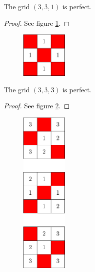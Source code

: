 \begin{con}
\label{con:3x3x1}
The grid $(3,3,1)$ is perfect.
\end{con}

\begin{proof}
See figure \ref{fig:3x3x1_numbered_heatmap}.
\end{proof}

\begin{figure}[]
\centering
\includegraphics[width=0.2\textwidth]{figures/A/3x3x1_numbered_heatmap.pdf}
\caption{}
\label{fig:3x3x1_numbered_heatmap}
\end{figure}

\begin{con}
\label{con:3x3x3}
The grid $(3,3,3)$ is perfect.
\end{con}

\begin{proof}
See figure \ref{fig:3x3x3_numbered_heatmap}.
\end{proof}

\begin{figure}[]
\centering
\includegraphics[width=0.2\textwidth]{figures/A/3x3x3_numbered_heatmap.pdf}
\caption{}
\label{fig:3x3x3_numbered_heatmap}
\end{figure}


